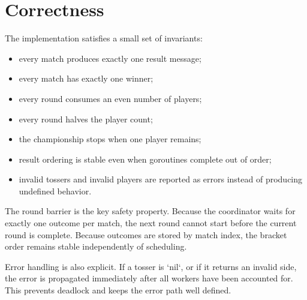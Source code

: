 \section{Correctness}

The implementation satisfies a small set of invariants:
\begin{itemize}
    \item every match produces exactly one result message;
    \item every match has exactly one winner;
    \item every round consumes an even number of players;
    \item every round halves the player count;
    \item the championship stops when one player remains;
    \item result ordering is stable even when goroutines complete out of order;
    \item invalid tossers and invalid players are reported as errors instead of producing undefined behavior.
\end{itemize}

The round barrier is the key safety property.
Because the coordinator waits for exactly one outcome per match, the next round cannot start before the current round
is complete.
Because outcomes are stored by match index, the bracket order remains stable independently of scheduling.

Error handling is also explicit.
If a tosser is `nil`, or if it returns an invalid side, the error is propagated immediately after all workers have been
accounted for.
This prevents deadlock and keeps the error path well defined.

